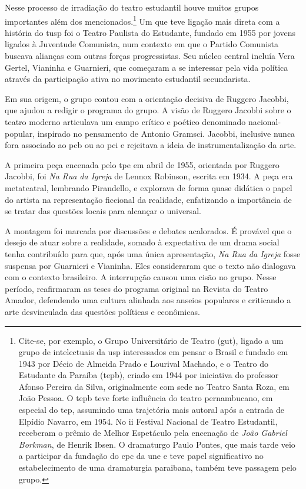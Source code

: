 \subject{Estudantes e a ideia de nacional-popular: Teatro Paulista do
Estudante}

Nesse processo de irradiação do teatro estudantil houve muitos grupos
importantes além dos mencionados.\footnote{Cite-se, por exemplo, o Grupo
  Universitário de Teatro ({\sc gut}), ligado a um grupo de intelectuais da
  {\sc usp} interessados em pensar o Brasil e fundado em 1943 por Décio de
  Almeida Prado e Lourival Machado, e o Teatro do Estudante da Paraíba
  ({\sc tep}b), criado em 1944 por iniciativa do professor Afonso Pereira da
  Silva, originalmente com sede no Teatro Santa Roza, em João Pessoa. O
  {\sc tep}b teve forte influência do teatro pernambucano, em especial do {\sc tep},
  assumindo uma trajetória mais autoral após a entrada de Elpídio
  Navarro, em 1954. No {\sc ii} Festival Nacional de Teatro Estudantil,
  receberam o prêmio de Melhor Espetáculo pela encenação de {\it João
  Gabriel Borkman}, de Henrik Ibsen. O dramaturgo Paulo Pontes, que mais
  tarde veio a participar da fundação do {\sc cpc} da {\sc une} e teve papel
  significativo no estabelecimento de uma dramaturgia paraibana, também
  teve passagem pelo grupo.} Um que teve ligação mais direta com a
história do {\sc tusp} foi o Teatro Paulista do Estudante, fundado em 1955 por
jovens ligados à Juventude Comunista, num contexto em que o Partido
Comunista buscava alianças com outras forças progressistas. Seu núcleo
central incluía Vera Gertel, Vianinha e Guarnieri, que começaram a se
interessar pela vida política através da participação ativa no movimento
estudantil secundarista.

Em sua origem, o grupo contou com a orientação decisiva de Ruggero
Jacobbi, que ajudou a redigir o programa do grupo. A visão de Ruggero
Jacobbi sobre o teatro moderno articulava um campo crítico e poético
denominado nacional-popular, inspirado no pensamento de Antonio Gramsci.
Jacobbi, inclusive nunca fora associado ao {\sc pcb} ou ao {\sc pci} e rejeitava a
ideia de instrumentalização da arte.

A primeira peça encenada pelo {\sc tpe} em abril de 1955, orientada por
Ruggero Jacobbi, foi {\it Na Rua da Igreja} de Lennox Robinson, escrita
em 1934. A peça era metateatral, lembrando Pirandello, e explorava de
forma quase didática o papel do artista na representação ficcional da
realidade, enfatizando a importância de se tratar das questões locais
para alcançar o universal.

A montagem foi marcada por discussões e debates acalorados. É provável
que o desejo de atuar sobre a realidade, somado à expectativa de um
drama social tenha contribuído para que, após uma única apresentação,
{\it Na Rua da Igreja} fosse suspensa por Guarnieri e Vianinha. Eles
consideraram que o texto não dialogava com o contexto brasileiro. A
interrupção causou uma cisão no grupo. Nesse período, reafirmaram as
teses do programa original na Revista do Teatro Amador, defendendo uma
cultura alinhada aos anseios populares e criticando a arte desvinculada
das questões políticas e econômicas.

